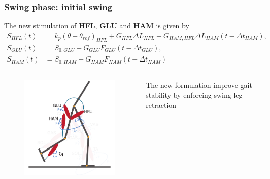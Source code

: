 \documentclass[10pt]{beamer}
\begin{document}
	
	\begin{frame}
		\frametitle{Swing phase: initial swing}
		
		\begin{block}{}
			The new stimulation of \textbf{HFL}, \textbf{GLU} and \textbf{HAM} is given by
			\begin{align*}
				S_{HFL}(t)&=  k_p (\theta-\theta_{ref})_{HFL} + G_{HFL}\Delta L_{HFL} - G_{HAM,HFL} \Delta L_{HAM}(t-\Delta t_{HAM}), \\
				S_{GLU}(t)&=  S_{0,GLU} + G_{GLU}F_{GLU}(t-\Delta t_{GLU}), \\
				S_{HAM}(t)&=  S_{0,HAM} + G_{HAM} F_{HAM} (t-\Delta t_{HAM}) 
			\end{align*}
		\end{block}
		
		\begin{columns}
			\begin{column}{.5\textwidth}
				\begin{figure}
					\centering
					\includegraphics[width=.5\textheight]{images/new_model/swing/muscle_initial.pdf}
				\end{figure}
			\end{column}
			\begin{column}{.5\textwidth}
				\begin{exampleblock}{}
					The new formulation improve gait stability by enforcing swing-leg retraction
				\end{exampleblock}
			\end{column}
		\end{columns}	
	\end{frame}
	
\end{document}
